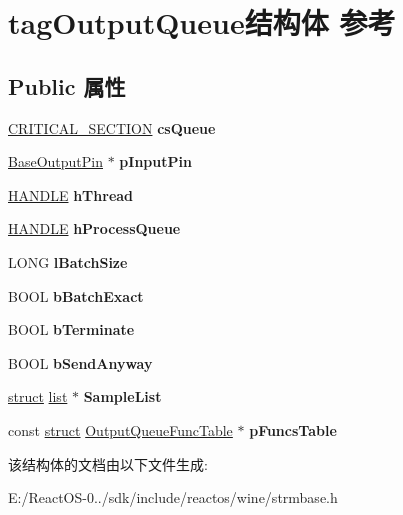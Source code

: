 \hypertarget{structtag_output_queue}{}\section{tag\+Output\+Queue结构体 参考}
\label{structtag_output_queue}
\subsection*{Public 属性}
\begin{DoxyCompactItemize}
\item 
\mbox{\label{structtag_output_queue_a8f89159b9c61bc4161819a2ebe7ac929}} 
\hyperlink{struct___c_r_i_t_i_c_a_l___s_e_c_t_i_o_n}{C\+R\+I\+T\+I\+C\+A\+L\+\_\+\+S\+E\+C\+T\+I\+ON} {\bfseries cs\+Queue}
\item 
\mbox{\label{structtag_output_queue_a4c971b6164b238f5fd0039279b86c6d8}} 
\hyperlink{struct_base_output_pin}{Base\+Output\+Pin} $\ast$ {\bfseries p\+Input\+Pin}
\item 
\mbox{\label{structtag_output_queue_a451b6c098c0bdbde1727e5163bf60b31}} 
\hyperlink{interfacevoid}{H\+A\+N\+D\+LE} {\bfseries h\+Thread}
\item 
\mbox{\label{structtag_output_queue_abc48d5fa93dd23b435451a4ae4abfba8}} 
\hyperlink{interfacevoid}{H\+A\+N\+D\+LE} {\bfseries h\+Process\+Queue}
\item 
\mbox{\label{structtag_output_queue_a765259e128ee98ada56c219ec71392a1}} 
L\+O\+NG {\bfseries l\+Batch\+Size}
\item 
\mbox{\label{structtag_output_queue_a81c793396bd354b4e6b25e67584c803c}} 
B\+O\+OL {\bfseries b\+Batch\+Exact}
\item 
\mbox{\label{structtag_output_queue_a954252ea59ce7e24e281177be9c48d6c}} 
B\+O\+OL {\bfseries b\+Terminate}
\item 
\mbox{\label{structtag_output_queue_a47a97688b50c2d2f31ed57de33ec0ad5}} 
B\+O\+OL {\bfseries b\+Send\+Anyway}
\item 
\mbox{\label{structtag_output_queue_a9c1ba22bcca2eaa414254b061ab24e20}} 
\hyperlink{interfacestruct}{struct} \hyperlink{classlist}{list} $\ast$ {\bfseries Sample\+List}
\item 
\mbox{\label{structtag_output_queue_a9fb179a21d34c334596138c258aa8ef2}} 
const \hyperlink{interfacestruct}{struct} \hyperlink{struct_output_queue_func_table}{Output\+Queue\+Func\+Table} $\ast$ {\bfseries p\+Funcs\+Table}
\end{DoxyCompactItemize}


该结构体的文档由以下文件生成\+:\begin{DoxyCompactItemize}
\item 
E\+:/\+React\+O\+S-\/0../sdk/include/reactos/wine/strmbase.\+h\end{DoxyCompactItemize}
